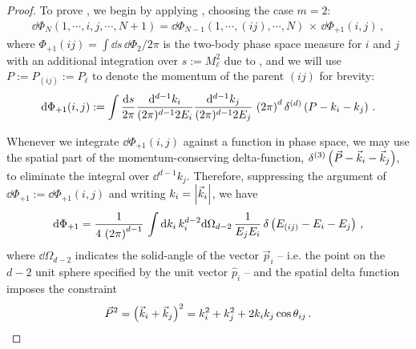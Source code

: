\begin{proof}
    To prove , we begin by applying , choosing the case \(m=2\):
    \begin{align}
        \dd \Phi_{N}(1, \cdots, i, j, \cdots, N+1)
        =
        \dd \Phi_{N-1}(1, \cdots, (ij), \cdots, N)
        \,
        \times
        \,
        \dd\Phi_{+1}(i,j)
        \,,
    \end{align}
    where \(\Phi_{+1}(ij) = \int \dd s \, \dd \Phi_2 / 2\pi\) is the two-body phase space measure for \(i\) and \(j\) with an additional integration over \(s := M_\ell^2\) due to , and we will use \(P := P_{(ij)} := P_\ell\) to denote the momentum of the parent \((ij)\) for brevity:
    \begin{align}
        \dd \Phi_{+1}(i,j)
        :=
        \int \frac{\dd s}{2\pi}
        \frac{\dd^{d-1} k_i}{(2\pi)^{d-1} 2 E_i}
        \frac{\dd^{d-1} k_j}{(2\pi)^{d-1} 2 E_j}
        \,
        \left(2\pi\right)^d \delta^{(d)}\left(P - k_i - k_j\right)
        \,.
    \end{align}


    Whenever we integrate \(\dd \Phi_{+1}(i, j)\) against a function in phase space, we may use the spatial part of the momentum-conserving delta-function, \(\delta^{(3)}\left(\vec{P} - \vec{k}_i - \vec{k}_j\right)\), to eliminate the integral over \(\dd^{d-1} k_j\).
    Therefore, suppressing the argument of \(\dd \Phi_{+1} := \dd \Phi_{+1}(i, j)\) and writing \(k_i = \abs{\vec{k}_i}\), we have
    \begin{align}
        \dd \Phi_{+1}
        =
        \frac{1}{4\,\left(2\pi\right)^{d-1}}
        \,
        \int
        \dd k_i \, k_i^{d-2} \dd\Omega_{d-2}
        \,
        \frac{1}{E_j E_i}
        \,
        \delta\left(E_{(ij)} - E_i - E_j\right)
        \,,
    \end{align}
    where \(\dd \Omega_{d-2}\) indicates the solid-angle of the vector \(\vec{p}_i\) -- i.e. the point on the \(d-2\) unit sphere specified by the unit vector \(\hat{p}_i\) -- and the spatial delta function imposes the constraint
    \begin{align}
        \vec{P}^2 = \left(\vec{k}_i + \vec{k}_j\right)^2
        =
        k_i^2 + k_j^2 + 2 k_i k_j \cos\theta_{ij}
        \,.
    \end{align}


\end{proof}
